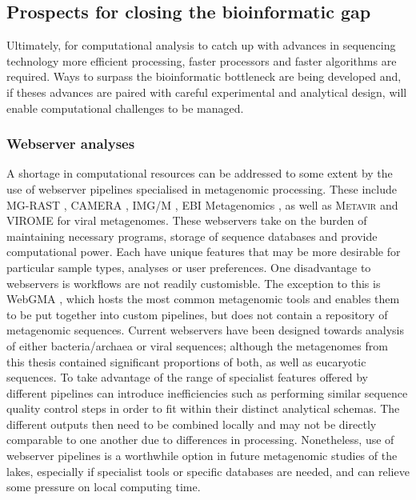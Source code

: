 \subsection{Prospects for closing the bioinformatic gap}
Ultimately, for computational analysis to catch up with advances in sequencing technology more efficient processing, faster processors and faster algorithms are required.
Ways to surpass the bioinformatic bottleneck are being developed and, if theses advances are paired with careful experimental and analytical design, will enable computational challenges to be managed.

\subsubsection{Webserver analyses}
A shortage in computational resources can be addressed to some extent by the use of webserver pipelines specialised in metagenomic processing.
These include \acs{MG-RAST} \cite{Meyer2008}, \acs{CAMERA} \cite{Sun2011}, \acs{IMG/M} \cite{Markowitz2008, Markowitz2012}, EBI Metagenomics \cite{Hunter2012}, as well as \textsc{Metavir} \cite{Roux2011} and \acs{VIROME} \cite{Wommack2012} for viral metagenomes.
These webservers take on the burden of maintaining necessary programs, storage of sequence databases and provide computational power.
Each have unique features that may be more desirable for particular sample types, analyses or user preferences.
One disadvantage to webservers is workflows are not readily customisble.
The exception to this is WebGMA \cite{Wu2011a}, which hosts the most common metagenomic tools and enables them to be put together into custom pipelines, but does not contain a repository of metagenomic sequences.
Current webservers have been designed towards analysis of either bacteria/archaea or viral sequences; although the metagenomes from this thesis contained significant proportions of both, as well as eucaryotic sequences.
To take advantage of the range of specialist features offered by different pipelines can introduce inefficiencies such as performing similar sequence quality control steps in order to fit within their distinct analytical schemas. 
The different outputs then need to be combined locally and may not be directly comparable to one another due to differences in processing.
Nonetheless, use of webserver pipelines is a worthwhile option in future metagenomic studies of the lakes, especially if specialist tools or specific databases are needed, and can relieve some pressure on local computing time.

